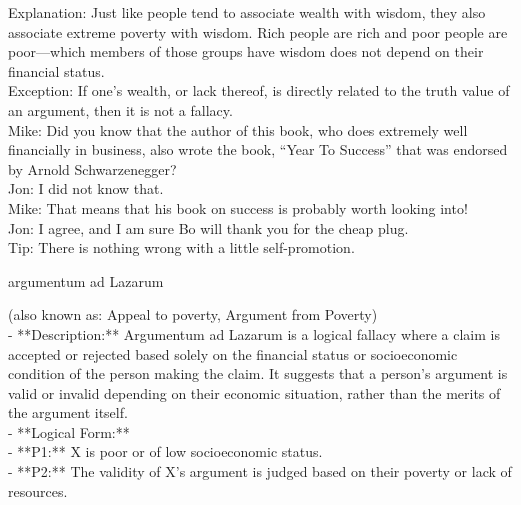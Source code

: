 \documentclass[a4paper,12pt,single,pdftex]{scrbook}
\begin{document}
{    
      Explanation: Just like people tend to associate wealth with wisdom, they also associate extreme poverty with wisdom.  Rich people are rich and poor people are poor—which members of those groups have wisdom does not depend on their financial status.
    \\

    
      Exception: If one’s wealth, or lack thereof, is directly related to the truth value of an argument, then it is not a fallacy.
    \\

    
      Mike: Did you know that the author of this book, who does extremely well financially in business, also wrote the book, “Year To Success” that was endorsed by Arnold Schwarzenegger?
    \\

    
      Jon: I did not know that.
    \\

    
      Mike: That means that his book on success is probably worth looking into!
    \\

    
      Jon: I agree, and I am sure Bo will thank you for the cheap plug.
    \\

    
      Tip: There is nothing wrong with a little self-promotion.
    \\

  }


argumentum ad Lazarum
    
      (also known as: Appeal to poverty, Argument from Poverty)
    \\

  
    
      - **Description:** Argumentum ad Lazarum is a logical fallacy where a claim is accepted or rejected based solely on the financial status or socioeconomic condition of the person making the claim. It suggests that a person's argument is valid or invalid depending on their economic situation, rather than the merits of the argument itself.
    \\

    
      - **Logical Form:**
    \\

    
        - **P1:** X is poor or of low socioeconomic status.
    \\

    
        - **P2:** The validity of X's argument is judged based on their poverty or lack of resources.
    \\
\end{document}
